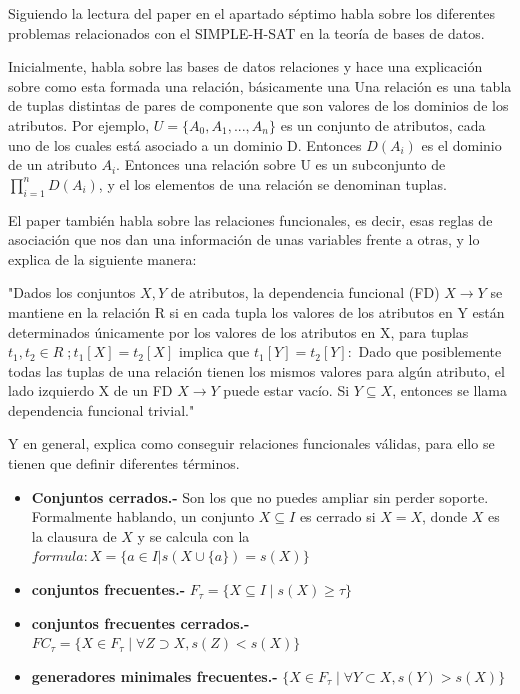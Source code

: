 \documentclass{cosas/tfg_domingo}
\begin{document}
Siguiendo la lectura del paper \citep{Thomas} en el apartado séptimo habla sobre los diferentes problemas relacionados con el SIMPLE-H-SAT en la teoría de bases de datos.

Inicialmente, habla sobre las bases de datos relaciones y hace una explicación sobre como esta formada una relación, básicamente una
Una relación es una tabla de tuplas distintas de pares de componente que son valores de los dominios de los atributos. Por ejemplo, $U = \{A_0,A_1,...,A_n\}$ es un conjunto de atributos, cada uno de los cuales está asociado a un dominio D. Entonces $D(A_i)$ es el dominio de un atributo $A_i$. 
Entonces una relación sobre U es un subconjunto de $\prod_{i=1}^{n}D(A_i)$, y el los elementos de una relación se denominan tuplas.

El paper también habla sobre las relaciones funcionales, es decir, esas reglas de asociación que nos dan una información de unas variables frente a otras, y lo explica de la siguiente manera:

"Dados los conjuntos $ X, Y $ de atributos, la dependencia funcional (FD) $ X \rightarrow Y $ se mantiene en la relación R si en cada tupla los valores de los atributos en Y están determinados únicamente por los valores de los atributos en X, para tuplas $ t_1 , t_2 \in R \;; t_1 [X] = t_2 [X] $ implica que $ t_1 [Y] = t_2 [Y]: $ Dado que posiblemente todas las tuplas de una relación tienen los mismos valores para algún atributo, el lado izquierdo X de un FD $ X \rightarrow Y $ puede estar vacío. Si $Y \subseteq X$, entonces se llama dependencia funcional trivial."

Y en general, explica como conseguir relaciones funcionales válidas, para ello se tienen que definir diferentes términos.

\begin{itemize}
    \item \textbf{Conjuntos cerrados.-} Son los que no puedes ampliar sin perder soporte. Formalmente hablando, un conjunto $X \subseteq I$ es cerrado si $X=X$, donde $X$ es la clausura de $X$ y se calcula con la $formula :X=\{a \in I |s( X \cup\{a\}) = s(X)\}$
    
    \item \textbf{conjuntos frecuentes.-} $F_\tau=\{X \subseteq I \;|\; s(X) \geq \tau\}$
    \item \textbf{conjuntos frecuentes cerrados.-} $FC_\tau=\{X \in F_\tau \;|\; \forall Z \supset X,s(Z)<s(X)\}$
    \item \textbf{generadores minimales frecuentes.-} $\{X \in F_\tau \;|\; \forall Y \subset X,s(Y)>s(X)\}$
    
\end{itemize}
\end{document}
